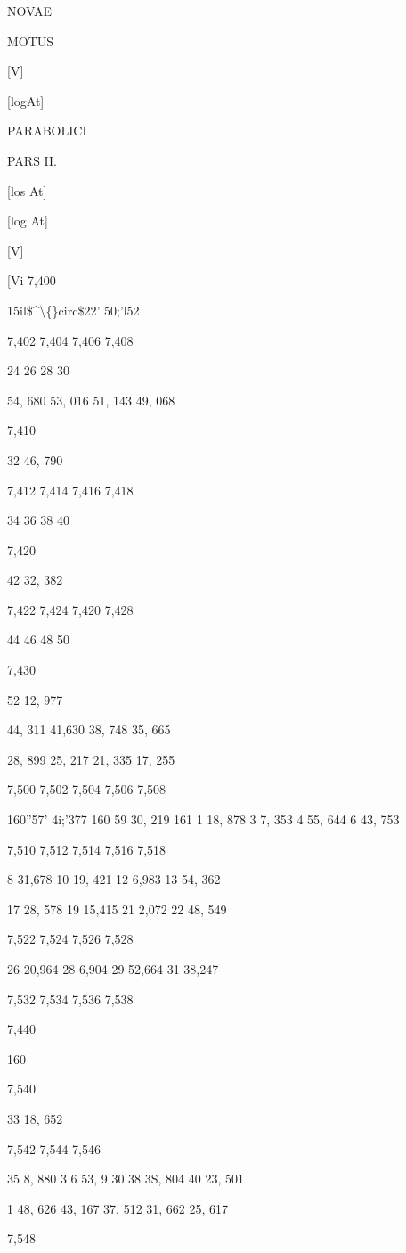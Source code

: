 \documentclass[10pt,a4paper]{article}
\begin{document}
NOVAE

MOTUS

[V]

[logAt]

PARABOLICI


PARS II.

[los At]

[log At]

[V]

[Vi
7,400

15il\$\textasciicircum{}\textbackslash\{\}circ\$22' 50;'l52

7,402
7,404
7,406
7,408

24
26
28
30

54, 680
53, 016
51, 143
49, 068

7,410

32 46, 790

7,412
7,414
7,416
7,418

34
36
38
40

7,420

42 32, 382

7,422
7,424
7,420
7,428

44
46
48
50

7,430

52 12, 977

44, 311
41,630
38, 748
35, 665

28, 899
25, 217
21, 335
17, 255

7,500
7,502
7,504
7,506
7,508

160''57' 4i;'377
160 59 30, 219
161 1 18, 878
3 7, 353
4 55, 644
6 43, 753

7,510
7,512
7,514
7,516
7,518

8 31,678
10 19, 421
12 6,983
13 54, 362

17 28, 578
19 15,415
21 2,072
22 48, 549

7,522
7,524
7,526
7,528

26 20,964
28 6,904
29 52,664
31 38,247

7,532
7,534
7,536
7,538

7,440

160

7,540

33 18, 652

7,542
7,544
7,546

35
8, 880
3 6 53, 9 30
38 3S, 804
40 23, 501

1 48, 626
43, 167
37, 512
31, 662
25, 617

7,548
\end{document}
